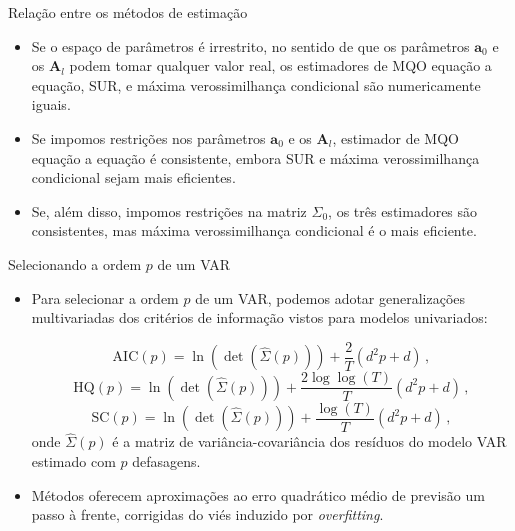 \documentclass[11pt]{beamer}
\begin{document}
\begin{frame}{Relação entre os métodos de estimação}
\begin{itemize}
	\item Se o espaço de parâmetros é irrestrito, no sentido de que os parâmetros $\boldsymbol{a}_0$ e os $\boldsymbol{A}_l$ podem tomar qualquer valor real, os estimadores de MQO equação a equação, SUR, e máxima verossimilhança condicional são {\color{blue}numericamente iguais}.
	\item Se impomos restrições nos parâmetros $\boldsymbol{a}_0$ e os $\boldsymbol{A}_l$, estimador de MQO equação a equação é consistente, embora SUR e máxima verossimilhança condicional sejam mais eficientes.
	\item Se, além disso, impomos restrições na matriz ${\Sigma}_0$, os três estimadores são consistentes, mas máxima verossimilhança condicional é o mais eficiente.
\end{itemize}
\end{frame}

\begin{frame}{Selecionando a ordem $p$ de um VAR}
	\begin{itemize}
		\item Para selecionar a ordem $p$ de um VAR, podemos adotar generalizações multivariadas dos critérios de informação vistos para modelos univariados:
		
		$$\text{AIC}(p) = \operatorname{ln}(\operatorname{det}(\hat\Sigma(p))) + \frac{2}{T}(d^2 p + d)\, ,$$
						$$\text{HQ}(p) = \operatorname{ln}(\operatorname{det}(\hat\Sigma(p))) + \frac{2 \log \log(T)}{T}(d^2 p + d)\, ,$$
				$$\text{SC}(p) = \operatorname{ln}(\operatorname{det}(\hat\Sigma(p))) + \frac{\log(T)}{T}(d^2 p + d)\, ,$$
	onde $\hat \Sigma(p)$ é a matriz de variância-covariância dos resíduos do modelo VAR estimado com $p$ defasagens.
	\item Métodos oferecem aproximações ao erro quadrático médio de previsão um passo à frente, corrigidas do viés induzido por \textit{overfitting}.
	\end{itemize}
\end{frame}
\end{document}
